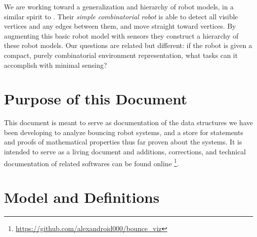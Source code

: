 \documentclass[]{article}
\begin{document}
We are working toward a generalization and hierarchy of robot models, in a
similar spirit to \cite{brunner2008simple}. Their {\em simple
combinatorial robot} is able to detect all visible vertices and any edges
between them, and move straight toward vertices. By augmenting this basic robot model
with sensors they construct a hierarchy of these robot models. Our questions are related but 
different: if the robot is given a compact, purely combinatorial environment representation, 
what tasks can it accomplish with minimal sensing?

\section{Purpose of this Document}

This document is meant to serve as documentation of the data structures we have
been developing to analyze bouncing robot systems, and a store for 
statements and proofs of mathematical properties thus far proven about the
systems.
It is intended to serve as a living document and additions, corrections, and
technical documentation of related softwares can be found online
\footnote{\url{https://github.com/alexandroid000/bounce_viz}}.


\section{Model and Definitions} \label{secmodel}
\end{document}
